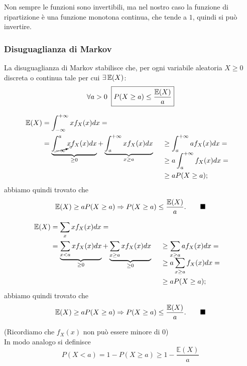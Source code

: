 \noindent Non sempre le funzioni sono invertibili, ma nel nostro caso la funzione di ripartizione è una funzione monotona continua, che tende a $1$, quindi si può invertire.

\subsubsection{Disuguaglianza di Markov}
La disuguaglianza di Markov stabilisce che, per ogni variabile aleatoria $X \geq 0$ discreta o continua tale per cui $\exists \, \mathbb{E}(X)$:
\[
\forall a > 0 \: \  \boxed{
P(X \geq a) \leq \frac {\mathbb{E}(X)}a
}
\]
\begin{dimostrazione}
\begin{alignat*}{4}
    \mathbb{E}(X) &= \int_{-\infty}^{+\infty} x f_X(x) dx = \\
    &= \underbrace{\int_{\cancelto{0}{-\infty}}^a x f_X(x) dx}_{\geq 0} + 
    \underbrace{\int_a^{+\infty} x f_X(x) dx}_{x \geq a} 
    \ && \geq \int_a^{+\infty} a f_X(x) dx = \\[-2em] 
    && & \geq a \int_a^{+\infty} f_X(x) dx = \\
    && &\geq a P(X \geq a);
\end{alignat*}
abbiamo quindi trovato che \begin{align*}
\mathbb{E}(X) \geq a P(X\geq a) \Rightarrow P(X \geq a) \leq \frac{\mathbb{E}(X)}{a}. \tag*{$\blacksquare$} 
\end{align*}
\end{dimostrazione}

\begin{dimostrazione}
\begin{alignat*}{4}
    \mathbb{E}(X) &= \sum_{x} x f_X(x) dx = \\
    &= \underbrace{\sum_{x < a} x f_X(x) dx}_{\geq 0} + 
    \underbrace{\sum_{x \geq a} x f_X(x) dx}_{ \geq 0} 
    \ && \geq \sum_{x \geq a} a f_X(x) dx = \\[-2em] 
    && & \geq a \sum_{x \geq a} f_X(x) dx = \\
    && &\geq a P(X \geq a);
\end{alignat*}
abbiamo quindi trovato che \begin{align*}
\mathbb{E}(X) \geq a P(X\geq a) \Rightarrow P(X \geq a) \leq \frac{\mathbb{E}(X)}{a}. \tag*{$\blacksquare$} 
\end{align*}
\end{dimostrazione}
\noindent (Ricordiamo che $f_X(x)$ non può essere minore di 0) \\
\noindent In modo analogo si definisce
$$
P(X < a) = 1 - P(X \geq a) \geq 1 - \frac{\mathbb{E}(X)}{a}
$$

